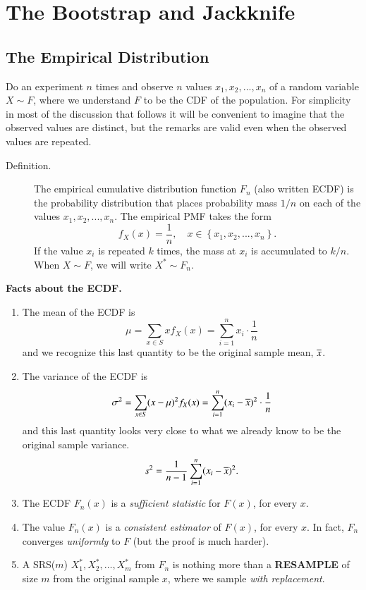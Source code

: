 \documentclass[captions=tableheading]{scrbook}
\begin{document}
\chapter{The Bootstrap and Jackknife}
\label{sec-4}
\section{The Empirical Distribution}
\label{sec-4_1}


Do an experiment $n$ times and observe $n$ values \(x_{1}, x_{2}, ..., x_{n}\) of a random variable \(X \sim F\), where we understand $F$ to be the CDF of the population. For simplicity in most of the discussion that follows it will be convenient to imagine that the observed values are distinct, but the remarks are valid even when the observed values are repeated. 


\begin{description}
\item[Definition.] The empirical cumulative distribution function \(F_{n}\) (also written ECDF) is the probability distribution that places probability mass \(1/n\) on each of the values \(x_{1}, x_{2}, ..., x_{n}\). The empirical PMF takes the form 
  \begin{equation*}
  f_{X}(x)=\frac{1}{n},\quad x\in\left\{ x_{1},x_{2},...,x_{n}\right\}.
  \end{equation*}
  If the value \(x_{i}\) is repeated \(k\) times, the mass at \(x_{i}\) is accumulated to \(k/n\).  When $X \sim F$, we will write $X^{\ast} \sim F_{n}$.
\end{description}

\bigskip
\textbf{Facts about the ECDF.}


\begin{enumerate}
\item The mean of the ECDF is
   \[
   \mu=\sum_{x\in S}xf_{X}(x)=\sum_{i=1}^{n}x_{i}\cdot\frac{1}{n}
   \]
   and we recognize this last quantity to be the original sample mean, \(\overline{x}\).
\item The variance of the ECDF is
   \[
   \sigma^{2}=\sum_{x\in S}(x-\mu)^{2}f_{X}(x)=\sum_{i=1}^{n}(x_{i}-\overline{x})^{2}\cdot\frac{1}{n}
   \]
   and this last quantity looks very close to what we already know to be the original sample variance.
   \[
   s^{2}=\frac{1}{n-1}\sum_{i=1}^{n}(x_{i}-\overline{x})^{2}.
   \]
\item The ECDF $F_{n}(x)$ is a \emph{sufficient statistic} for $F(x)$, for every $x$.
\item The value $F_{n}(x)$ is a \emph{consistent estimator} of $F(x)$, for every $x$.  In fact, $F_{n}$ converges \emph{uniformly} to $F$ (but the proof is much harder).
\item A SRS($m$) \(X_{1}^{\ast},X_{2}^{\ast},\ldots,X_{m}^{\ast}\) from $F_{n}$ is nothing more than a \textbf{RESAMPLE} of size $m$ from the original sample $x$, where we sample \emph{with replacement}.
\end{enumerate}
\end{document}
